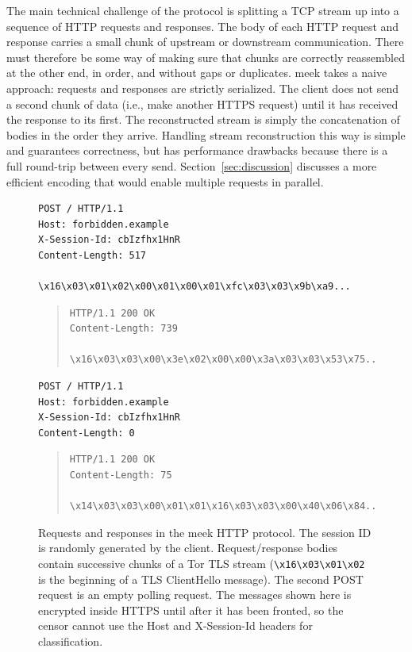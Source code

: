 \documentclass{sig-alternate}
\newcommand{\meek}{meek\xspace}
\begin{document}
The main technical challenge of the protocol is splitting a TCP stream up
into a sequence of HTTP requests and responses.
The body of each HTTP request and response carries
a small chunk of upstream or downstream communication.
There must therefore be some way of making sure that chunks
are correctly reassembled at the other end,
in order, and without gaps or duplicates.
\meek takes a naive approach: requests and responses are strictly serialized.
The client does not send a second chunk of data
(i.e., make another HTTPS request) until it has
received the response to its first.
The reconstructed stream is simply the concatenation
of bodies in the order they arrive.
Handling stream reconstruction this way is simple and guarantees correctness,
but has performance drawbacks because there is a full round-trip
between every send.
Section~\ref{sec:discussion} discusses a more efficient encoding
that would enable multiple requests in parallel.

\begin{figure}
\scriptsize
\begin{verbatim}
POST / HTTP/1.1
Host: forbidden.example
X-Session-Id: cbIzfhx1HnR
Content-Length: 517

\x16\x03\x01\x02\x00\x01\x00\x01\xfc\x03\x03\x9b\xa9...
\end{verbatim}
\begin{quote}
\begin{verbatim}
HTTP/1.1 200 OK
Content-Length: 739

\x16\x03\x03\x00\x3e\x02\x00\x00\x3a\x03\x03\x53\x75...
\end{verbatim}
\end{quote}
\begin{verbatim}
POST / HTTP/1.1
Host: forbidden.example
X-Session-Id: cbIzfhx1HnR
Content-Length: 0

\end{verbatim}
\begin{quote}
\begin{verbatim}
HTTP/1.1 200 OK
Content-Length: 75

\x14\x03\x03\x00\x01\x01\x16\x03\x03\x00\x40\x06\x84...
\end{verbatim}
\end{quote}
\caption{
Requests and responses in the \meek HTTP protocol.
The session ID is randomly generated by the client.
Request/response bodies contain successive chunks of a Tor TLS stream
(\texttt{\textbackslash{}x16\textbackslash{}x03\textbackslash{}x01\textbackslash{}x02}
is the beginning of a TLS ClientHello message).
The second POST request is an empty polling request.
The messages shown here is encrypted inside HTTPS until after
it has been fronted,
so the censor cannot use the
Host and \mbox{X-Session-Id} headers for classification.
}
\label{fig:protocol}
\end{figure}
\end{document}
